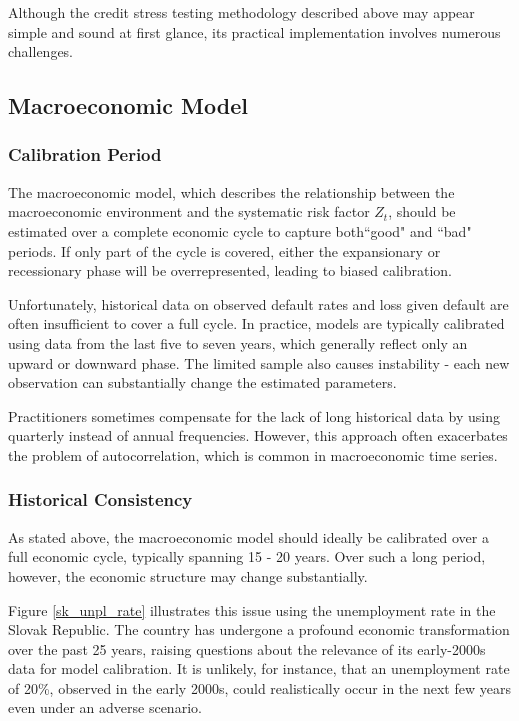 \documentclass[11pt,a4paper]{article}
\begin{document}
Although the credit stress testing methodology described above may appear simple and sound at first glance, its practical implementation involves numerous challenges.

\subsection{Macroeconomic Model}

\subsubsection{Calibration Period}

The macroeconomic model, which describes the relationship between the macroeconomic environment and the systematic risk factor $Z_t$, should be estimated over a complete economic cycle to capture both``good" and ``bad" periods. If only part of the cycle is covered, either the expansionary or recessionary phase will be overrepresented, leading to biased calibration.

Unfortunately, historical data on observed default rates and loss given default are often insufficient to cover a full cycle. In practice, models are typically calibrated using data from the last five to seven years, which generally reflect only an upward or downward phase. The limited sample also causes instability - each new observation can substantially change the estimated parameters.

Practitioners sometimes compensate for the lack of long historical data by using quarterly instead of annual frequencies. However, this approach often exacerbates the problem of autocorrelation, which is common in macroeconomic time series.

\subsubsection{Historical Consistency}

As stated above, the macroeconomic model should ideally be calibrated over a full economic cycle, typically spanning 15 - 20 years. Over such a long period, however, the economic structure may change substantially.

Figure \ref{sk_unpl_rate} illustrates this issue using the unemployment rate in the Slovak Republic. The country has undergone a profound economic transformation over the past 25 years, raising questions about the relevance of its early-2000s data for model calibration. It is unlikely, for instance, that an unemployment rate of 20\%, observed in the early 2000s, could realistically occur in the next few years even under an adverse scenario.
\end{document}
